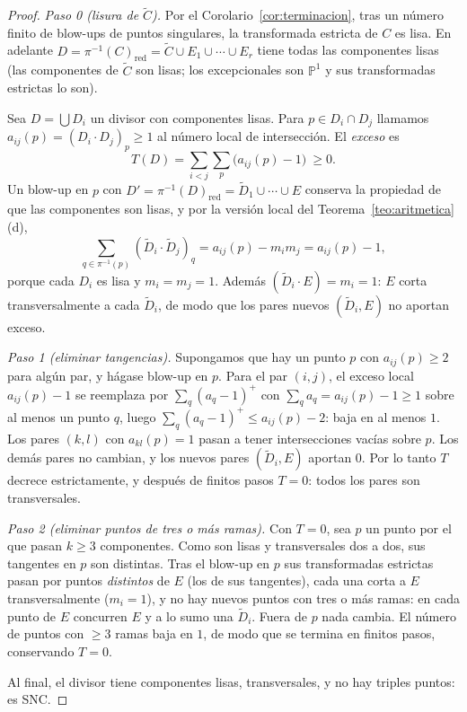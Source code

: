 \documentclass[11pt,a4paper,oneside]{book}
\newcommand{\PP}{\mathbb{P}}
\theoremstyle{plain}
\theoremstyle{definition}
\theoremstyle{remark}
\begin{document}
\begin{proof}
\emph{Paso 0 (lisura de $\tilde C$).} Por el Corolario~\ref{cor:terminacion}, tras un número finito de blow-ups de puntos singulares, la transformada estricta de $C$ es lisa. En adelante $D=\pi^{-1}(C)_{\mathrm{red}}=\tilde C\cup E_1\cup\cdots\cup E_r$ tiene todas las componentes lisas (las componentes de $\tilde C$ son lisas; los excepcionales son $\PP^1$ y sus transformadas estrictas lo son).

Sea $D=\bigcup D_i$ un divisor con componentes lisas. Para $p\in D_i\cap D_j$ llamamos $a_{ij}(p)=(D_i\cdot D_j)_p\ge1$ al número local de intersección. El \emph{exceso} es
\[
T(D)=\sum_{i<j}\sum_{p}\big(a_{ij}(p)-1\big)\ \ge0 .
\]
Un blow-up en $p$ con $D'=\pi^{-1}(D)_{\mathrm{red}}=\tilde D_1\cup\cdots\cup E$ conserva la propiedad de que las componentes son lisas, y por la versión local del Teorema~\ref{teo:aritmetica}(d),
\[
\sum_{q\in\pi^{-1}(p)}(\tilde D_i\cdot\tilde D_j)_q=a_{ij}(p)-m_im_j=a_{ij}(p)-1,
\]
porque cada $D_i$ es lisa y $m_i=m_j=1$. Además $(\tilde D_i\cdot E)=m_i=1$: $E$ corta transversalmente a cada $\tilde D_i$, de modo que los pares nuevos $(\tilde D_i,E)$ no aportan exceso.

\emph{Paso 1 (eliminar tangencias).} Supongamos que hay un punto $p$ con $a_{ij}(p)\ge2$ para algún par, y hágase blow-up en $p$. Para el par $(i,j)$, el exceso local $a_{ij}(p)-1$ se reemplaza por $\sum_q(a_q-1)^+$ con $\sum_qa_q=a_{ij}(p)-1\ge1$ sobre al menos un punto $q$, luego $\sum_q(a_q-1)^+\le a_{ij}(p)-2$: baja en al menos $1$. Los pares $(k,l)$ con $a_{kl}(p)=1$ pasan a tener intersecciones vacías sobre $p$. Los demás pares no cambian, y los nuevos pares $(\tilde D_i,E)$ aportan $0$. Por lo tanto $T$ decrece estrictamente, y después de finitos pasos $T=0$: todos los pares son transversales.

\emph{Paso 2 (eliminar puntos de tres o más ramas).} Con $T=0$, sea $p$ un punto por el que pasan $k\ge3$ componentes. Como son lisas y transversales dos a dos, sus tangentes en $p$ son distintas. Tras el blow-up en $p$ sus transformadas estrictas pasan por puntos \emph{distintos} de $E$ (los de sus tangentes), cada una corta a $E$ transversalmente ($m_i=1$), y no hay nuevos puntos con tres o más ramas: en cada punto de $E$ concurren $E$ y a lo sumo una $\tilde D_i$. Fuera de $p$ nada cambia. El número de puntos con $\ge3$ ramas baja en $1$, de modo que se termina en finitos pasos, conservando $T=0$.

Al final, el divisor tiene componentes lisas, transversales, y no hay triples puntos: es SNC.
\end{proof}
\end{document}

